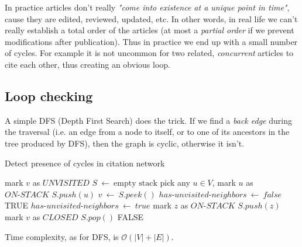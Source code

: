 In practice articles don't really \textit{"come into existence at a unique point in time"}, cause they are edited, reviewed, updated, etc.
In other words, in real life we can't really establish a total order of
the articles (at most a \textit{partial order} if we prevent modifications
after publication). Thus in practice we end up with a small number of
cycles. For example it is not uncommon for two
related, \textit{concurrent} articles to cite each other, thus creating an
obvious loop.

\subsection{Loop checking}

A simple DFS (Depth First Search) does the trick. If we find a
\textit{back edge} during the traversal (i.e. an edge from a node to
itself, or to one of its ancestors in the tree produced by DFS), then
the graph is cyclic, otherwise it isn't.
\newpage
\begin{algorithm}
	\caption{Detect presence of cycles in citation network}
	\begin{algorithmic}[1]
			\State mark $v$ as $UNVISITED$
		\EndFor
		\State $S \ \leftarrow \ \text{empty stack}$
		\State pick any $u \in V$, mark $u$ as $ON\text{-}STACK$
		\State $S.push(u)$
			\State $v \ \leftarrow \ S.peek()$
			\State $has\text{-}unvisited\text{-}neighbors \ \leftarrow \ false$
					\State \Return TRUE
					\State $has\text{-}unvisited\text{-}neighbors \ \leftarrow \ true$
					\State mark $z$ as $ON\text{-}STACK$
					\State $S.push(z)$
				\EndIf
			\EndFor
				\State mark $v$ as $CLOSED$
				\State $S.pop()$
			\EndIf
		\EndWhile
		\State \Return FALSE
	\end{algorithmic}
\end{algorithm}
\medskip

\noindent Time complexity, as for DFS, is $\mathcal{O}(|V|+|E|)$.
